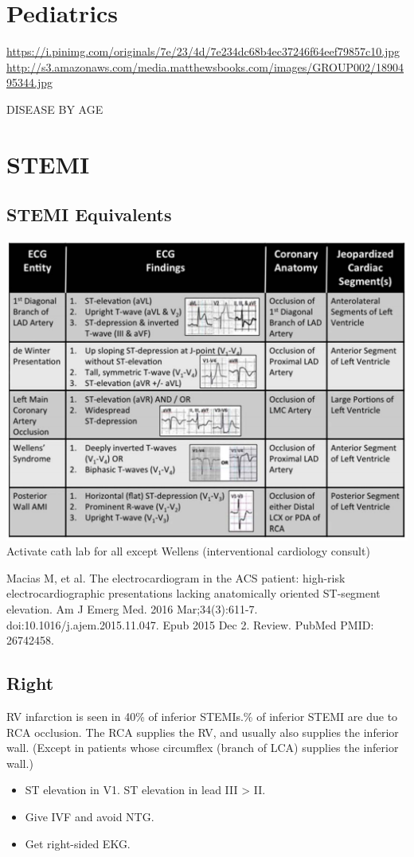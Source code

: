 \documentclass[8pt]{extarticle}
\begin{document}
\section{Pediatrics}

\url{https://i.pinimg.com/originals/7e/23/4d/7e234dc68b4ec37246f64eef79857c10.jpg}
\url{http://s3.amazonaws.com/media.matthewsbooks.com/images/GROUP002/1890495344.jpg}

DISEASE BY AGE

\newpage

\section{STEMI}
\subsection{STEMI Equivalents}
\includegraphics[height=\textwidth, angle=90]{5_ecgs.png}
Activate cath lab for all except Wellens (interventional cardiology consult)\break

\tiny{Macias M, et al. The electrocardiogram in the ACS
patient: high-risk electrocardiographic presentations lacking anatomically oriented ST-segment elevation. Am J Emerg Med. 2016 Mar;34(3):611-7. doi:10.1016/j.ajem.2015.11.047. Epub 2015 Dec 2. Review. PubMed PMID: 26742458.}
\subsection{Right}
RV infarction is seen in 40\% of inferior STEMIs.\% of inferior STEMI are due to RCA occlusion. The RCA supplies the RV, and usually also supplies the inferior wall. (Except in patients whose circumflex (branch of LCA) supplies the inferior wall.)
\begin{itemize}
    \item ST elevation in V1. ST elevation in lead III > II.
    \item Give IVF and avoid NTG.
    \item Get right-sided EKG.
\end{itemize}
\end{document}
